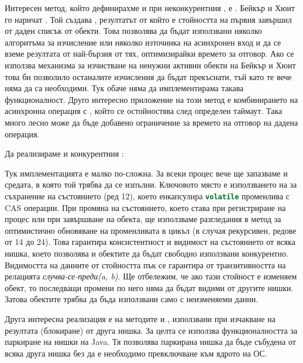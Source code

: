 Интересен метод, който дефинирахме и при неконкурентния , е . Бейкър и Хюит го наричат . Той създава , резултатът от който е стойността на първия завършил  от даден списък от  обекти. Това позволява да бъдат използвани няколко алгоритъма за изчисление или няколко източника на асинхронен вход и да се вземе резултата от най-бързия от тях, оптимизирайки времето за отговор. Ако се използва механизма за изчистване на ненужни активни  обекти на Бейкър и Хюит това би позволило останалите изчисления да бъдат прекъснати, тъй като те вече няма да са необходими. Тук обаче няма да имплементирама такава функционалност. Друго интересно приложение на този метод е комбинирането на асинхронна операция с , който се остойностява след определен таймаут. Така много лесно може да бъде добавено ограничение за времето на отговор на дадена операция.

Да реализираме и конкурентния :



Тук имплементацията е малко по-сложна. За всеки процес вече ще запазваме и средата, в която той трябва да се изпълни. Ключовото място е използването на  за съхранение на състоянието (ред 12), което енкапсулира \lstinline[language=Java]{volatile} променлива с CAS операции. При промяна на състоянието, което става при регистриране на процес или при завършване на  обекта, ще използваме разгледания в  метод за оптимистично обновяване на променливата в цикъл (в случая рекурсивен, редове от 14 до 24). Това гарантира консистентност и видимост на състоянието от всяка нишка, което позволява  и  обектите да бъдат свободно използвани конкурентно. Видимостта на данните от стойността пък се гарантира от транзитивността на релацията \emph{случва-се-преди(a, b)}. Ще отбележим, че ако тази стойност е изменяем обект, то последващи промени по него няма да бъдат видими от другите нишки. Затова  обектите трябва да бъда използвани само с неизменяеми данни.

Друга интересна реализация е на методите  и , използвани при изчакване на резултата (блокиране) от друга нишка. За целта се използва функционалността за паркиране на нишки на Java. Тя позволява паркирана нишка да бъде събудена от всяка друга нишка без да е необходимо превключване към ядрото на ОС.

